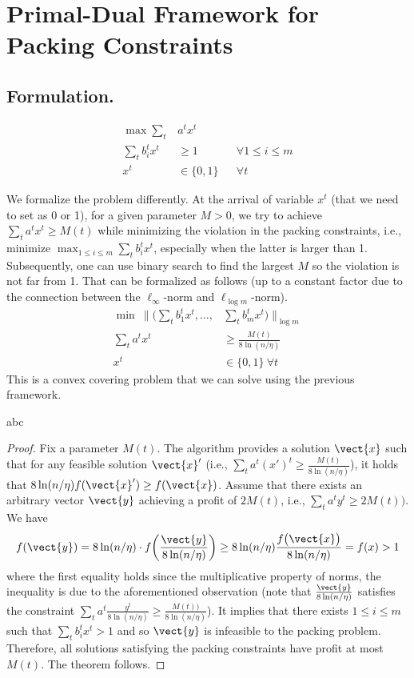 
\section{Primal-Dual Framework for Packing Constraints}		\label{sec:packing}

\subsection{Formulation.}

\begin{align*}
\max  \sum_{t} &a^{t} x^{t} \\
\sum_{t} b_{i}^{t} x^{t} &\geq 1 & &  \forall 1 \leq i \leq m \\
x^{t} &\in \{0,1\} & & \forall t
\end{align*}

We formalize the problem differently. At the arrival of variable $x^{t}$ (that we need to set as 0 or 1), for a given parameter $M > 0$, we try to achieve 
$\sum_{t} a^{t} x^{t} \geq M(t)$ while minimizing the violation in the packing constraints, i.e., minimize $\max_{1 \leq i \leq m} \sum_{t} b_{i}^{t} x^{t}$, especially when
the latter is larger than 1. Subsequently, one can use binary search to find the largest $M$ so the violation is not far from 1. 
That can be formalized as follows (up to a constant factor due to the connection between the $\ell_{\infty}$-norm and $\ell_{\log m}$-norm).  
%
\begin{align*}
\min ~ \biggl \| \biggl( \sum_{t} b_{1}^{t} x^{t}, \ldots, &\sum_{t} b_{m}^{t} x^{t} \biggr) \biggr \|_{\log m}  \\
\sum_{t} a^{t} x^{t} &\geq \frac{M(t)}{8\ln(n/\eta)}  \\
x^{t} &\in \{0,1\} ~ \forall t
\end{align*}
%
This is a convex covering problem that we can solve using the previous framework. 

\begin{theorem}
abc
\end{theorem}
%
\begin{proof}
Fix a parameter $M(t)$. The algorithm provides a solution $\vect{x}$ such that for any feasible solution $\vect{x}'$ 
(i.e., $\sum_{t} a^{t} (x')^{t} \geq \frac{M(t)}{8\ln(n/\eta)}$), it holds that
$8\ln(n/\eta) f(\vect{x}') \geq f(\vect{x})$. 
Assume that there exists an arbitrary vector $\vect{y}$ 
achieving a profit of $2M(t)$, i.e.,  $\sum_{t} a^{t} y^{t} \geq 2M(t))$.
We have
$$
f(\vect{y}) =  8\ln(n/\eta) \cdot f\biggl(\frac{\vect{y}}{8\ln(n/\eta)}\biggr) \geq
8\ln(n/\eta) \frac{f\bigl( \vect{x}\bigr)}{8\ln(n/\eta)} = f(x) > 1
$$
where the first equality holds since the multiplicative property of norms, the inequality is due to the aforementioned observation 
(note that $\frac{\vect{y}}{8\ln(n/\eta)}$ satisfies the constraint $\sum_{t} a^{t} \frac{y^{t}}{8\ln(n/\eta)} \geq \frac{M(t))}{8\ln(n/\eta)}$).
It implies that there exists $1 \leq i \leq m$ such that $\sum_{t} b_{i}^{t} x^{t} > 1$ and so $\vect{y}$ is infeasible to the packing problem.
Therefore, all solutions satisfying the packing constraints have profit at most $M(t)$. The theorem follows. 
\end{proof}


